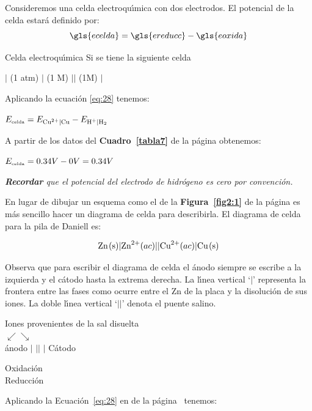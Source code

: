 Consideremos una celda electroqu\'{\i}mica con dos
electrodos.  El potencial de
la celda  estar\'a definido por:
\begin{equation}
\gls{ecelda} = \gls{ereducc}-\gls{eoxida}
\label{eq:28}
\end{equation}



\begin{ejemplo}{Celda electroqu\'{\i}mica}
Si se tiene la siguiente celda

\begin{center}
$|$ (1 atm) $|$  (1 M) $||$  (1M) $|$ 
\end{center}
Aplicando la ecuaci\'on \ref{eq:28} tenemos:
\begin{center}
$E_{\textrm{\tiny celda}} = E_{\ce{Cu^2+}|\ce{Cu}}-E_{\ce{H+}|\ce{H2}}$
\end{center}
A partir de los datos del \textbf{Cuadro~\ref{tabla7}} de la p\'agina \pageref{tabla7} obtenemos:
\begin{center}
$E_{\textrm{\tiny celda}} = 0.34  V - 0 V =  0.34 V$
\end{center}
\textit{\textbf{Recordar} que el potencial del electrodo de hidr\'ogeno es cero
por convenci\'on.}
\end{ejemplo}


En lugar de  dibujar un esquema como el de la \textbf{Figura~\ref{fig2:1}} de la
p\'agina \pageref{fig2:1} es m\'as sencillo hacer un diagrama de celda para describirla. El
diagrama de
 celda para la pila de Daniell  es:

$$\ce{Zn(s)}|\ce{Zn^2+}(ac)||\ce{Cu^2+}(ac)|\ce{Cu(s)}$$

Observa que para escribir el diagrama de celda el \'anodo siempre se escribe a la izquierda
y el c\'atodo hasta la extrema derecha. La l\'{\i}nea vertical `$|$' representa la frontera
entre las fases como ocurre entre el Zn de la placa y la disoluci\'on de sus iones. La doble
l\'{\i}nea vertical `$||$' denota el puente salino.
\begin{center}
Iones provenientes de la sal disuelta\\
$\swarrow \searrow$\\
\'anodo $|$ $||$  $|$   C\'atodo
\end{center}
\begin{description}
\item[Oxidaci\'on] 
\item[Reducci\'on] 
\end{description}
Aplicando la Ecuaci\'on~\ref{eq:28} en de la p\'agina~\pageref{eq:28} tenemos:

